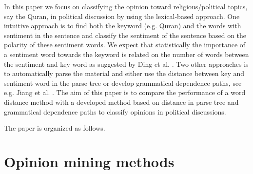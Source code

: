 \documentclass[11pt]{article}
\begin{document}
In this paper we focus on classifying the opinion toward religious/political topics, say the Quran, in political discussion by using the lexical-based approach. 
One intuitive approach is to find both the keyword (e.g. Quran) and the words with sentiment in the sentence and classify the sentiment of the sentence based on the polarity of these sentiment words. We expect that statistically the importance of a sentiment word towards the keyword is related on the number of words between the sentiment and key word as suggested by Ding et al. . Two other approaches is to automatically parse the material and either use the distance between key and sentiment word in the parse tree or develop grammatical dependence paths, see e.g. Jiang et al. . The aim of this paper is to compare the performance of a word distance method \cite{Ding08} with a developed method based on distance in parse tree and grammatical dependence paths to classify opinions in political discussions.

The paper is organized as follows. 

\section{Opinion mining methods}
\label{sec:om}
\end{document}
